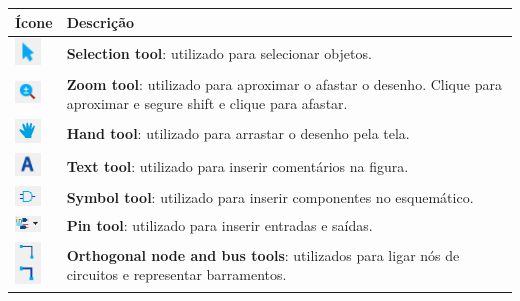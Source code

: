 \documentclass[12pt,a4paper]{article}
\begin{document}
\begin{minipage}{0.45\textwidth}
    \centering    
    \begin{tabular}{M{1cm} M{5.5cm}}
    \hline
    \textbf{Ícone} & \textbf{Descrição} \\ \hline

    \includegraphics[width=0.7cm]{./figs/selection.png} & \textbf{Selection tool}: utilizado para selecionar objetos. \\ \hline

    \includegraphics[width=0.7cm]{./figs/zoom.png} & \textbf{Zoom tool}: utilizado para aproximar o afastar o desenho. Clique para aproximar e segure shift e clique para afastar. \\ \hline

    \includegraphics[width=0.7cm]{./figs/hand.png} & \textbf{Hand tool}: utilizado para arrastar o desenho pela tela. \\ \hline

    \includegraphics[width=0.7cm]{./figs/text.png} & \textbf{Text tool}: utilizado para inserir comentários na figura. \\ \hline

    \includegraphics[width=0.7cm]{./figs/symb.png} & \textbf{Symbol tool}: utilizado para inserir componentes no esquemático. \\ \hline

    \includegraphics[width=0.7cm]{./figs/pin.png} & \textbf{Pin tool}: utilizado para inserir entradas e saídas. \\ \hline

    \includegraphics[width=0.7cm]{./figs/line.png} & \textbf{Orthogonal node and bus tools}: utilizados para ligar nós de circuitos e representar barramentos. \\
    
    \hline
    \end{tabular}
    \label{table:editor}
\end{minipage}
\end{document}
